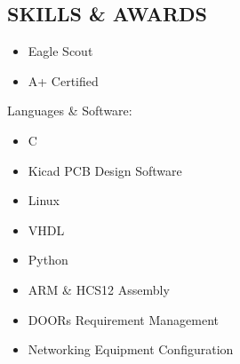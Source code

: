 \documentclass[line,mmmargin]{res}
\begin{document}
\begin{resume}
\section{SKILLS \& AWARDS} 
		\begin{multicols}{2}
			\begin{itemize}
				\itemsep -2pt
				\item[] Eagle Scout
				\item[] A+ Certified
			\end{itemize}
		\end{multicols}
	\vspace{-10pt}
	{Languages \& Software:} %
		\begin{multicols}{2}
			\begin{itemize}
				\itemsep -2pt
				\item[] C
				\item[] Kicad PCB Design Software
				\item[] Linux
				\item[] VHDL
				\item[] Python
				\item[] ARM \& HCS12 Assembly
				\item[] DOORs Requirement Management
				\item[] Networking Equipment Configuration
			\end{itemize}
		\end{multicols}

\end{resume}
\end{document}
